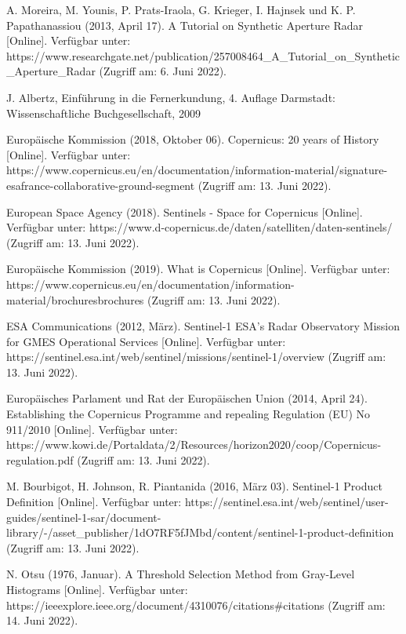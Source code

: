 \newpage
\thispagestyle{empty}
\begin{thebibliography}{1}

A. Moreira, M. Younis, P. Prats-Iraola, G. Krieger, I. Hajnsek und K. P. Papathanassiou (2013, April 17). A Tutorial on Synthetic Aperture Radar [Online]. Verfügbar unter: 
https://www.researchgate.net/publication/257008464\_A\_Tutorial\_on\_Synthetic\_Aperture\_Radar
(Zugriff am: 6. Juni 2022).

J. Albertz, Einführung in die Fernerkundung, 4. Auflage Darmstadt: Wissenschaftliche Buchgesellschaft, 2009

Europäische Kommission (2018, Oktober 06). Copernicus: 20 years of History [Online]. Verfügbar unter: 
https://www.copernicus.eu/en/documentation/information-material/signature-esafrance-collaborative-ground-segment
(Zugriff am: 13. Juni 2022).

European Space Agency (2018). Sentinels - Space for Copernicus [Online]. Verfügbar unter: 
https://www.d-copernicus.de/daten/satelliten/daten-sentinels/
(Zugriff am: 13. Juni 2022).

Europäische Kommission (2019). What is Copernicus [Online]. Verfügbar unter: 
https://www.copernicus.eu/en/documentation/information-material/brochuresbrochures
(Zugriff am: 13. Juni 2022).

ESA Communications (2012, März). Sentinel-1 ESA's Radar Observatory Mission for GMES Operational Services [Online]. Verfügbar unter: 
https://sentinel.esa.int/web/sentinel/missions/sentinel-1/overview
(Zugriff am: 13. Juni 2022).

Europäisches Parlament und Rat der Europäischen Union (2014, April 24). Establishing the Copernicus Programme and repealing Regulation (EU) No 911/2010 [Online]. Verfügbar unter: 
https://www.kowi.de/Portaldata/2/Resources/horizon2020/coop/Copernicus-regulation.pdf
(Zugriff am: 13. Juni 2022).

M. Bourbigot, H. Johnson, R. Piantanida (2016, März 03). Sentinel-1 Product Definition [Online]. Verfügbar unter: 
https://sentinel.esa.int/web/sentinel/user-guides/sentinel-1-sar/document-library/-/asset\_publisher/1dO7RF5fJMbd/content/sentinel-1-product-definition
(Zugriff am: 13. Juni 2022).

N. Otsu (1976, Januar). A Threshold Selection Method from Gray-Level Histograms [Online]. Verfügbar unter: 
https://ieeexplore.ieee.org/document/4310076/citations\#citations
(Zugriff am: 14. Juni 2022).


\end{thebibliography}
